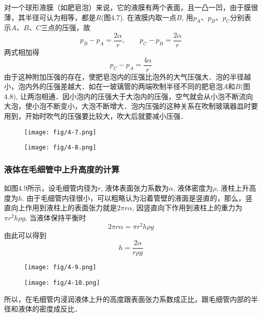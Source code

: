 对一个球形液膜（如肥皂泡）来说，它的液膜有两个表面，且一凸一凹，由于膜很薄，其半径可认为相等，都是$R$(图4.7). 在液膜内取一点$B$, 用$p_A$、$p_B$、$p_C$分别表示$A$、$B$、$C$三点的压强，故
\[p_B-p_A=\frac{2\alpha}{r},\qquad p_C-p_B=\frac{2\alpha}{r}\]
两式相加得
\[p_C-p_A=\frac{4\alpha}{r}\]
由于这种附加压强的存在，使肥皂泡内的压强比泡外的大气压强大．泡的半径越小，泡内外的压强差越大．如在一玻璃管的两端吹制半径不同的肥皂泡$A$和$B$(图4.8), 让两泡相通．因小泡内的压强大于大泡内的压强，空气就会从小泡不断流向大泡，使小泡不断变小，大泡不断增大．泡内压强的这种关系在吹制玻璃器皿时要用到，开始时吹气的压强要比较大，吹大后就要减小压强．

\begin{figure}[htp]\centering
    \begin{minipage}[t]{0.48\textwidth}
    \centering
    \texttt{[image: fig/4-7.png]}
    \caption{}
    \end{minipage}
    \begin{minipage}[t]{0.48\textwidth}
    \centering
    \texttt{[image: fig/4-8.png]}
    \caption{}
    \end{minipage}
    \end{figure}


\subsubsection{液体在毛细管中上升高度的计算}


如图4.9所示，设毛细管内径为$r$, 液体表面张力系数为$\alpha$, 液体密度为$\rho$, 液柱上升高度为$h$. 由于毛细管内径很小，可以粗略认为沿着管壁的液面是竖直的，那么，竖直向上作用到液柱上的表面张力就是$2\pi r\alpha$, 因竖直向下作用到液柱上的重力为$\pi r^2h\rho g$, 当液体保持平衡时
\[2\pi r\alpha=\pi r^2h\rho g\]
由此可以得到
\[h=\frac{2\alpha}{r\rho g}\]

\begin{figure}[htp]\centering
    \begin{minipage}[t]{0.48\textwidth}
    \centering
    \texttt{[image: fig/4-9.png]}
    \caption{}
    \end{minipage}
    \begin{minipage}[t]{0.48\textwidth}
    \centering
    \texttt{[image: fig/4-10.png]}
    \caption{}
    \end{minipage}
    \end{figure}

所以，在毛细管内浸润液体上升的高度跟表面张力系数成正比，跟毛细管内部的半径和液体的密度成反比．

